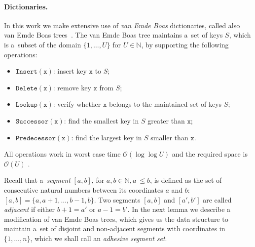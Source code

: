 \documentclass[runningheads]{llncs}
\newcommand{\Oh}{\mathcal{O}}
\renewcommand{\leq}{\leqslant}
\begin{document}
\paragraph*{Dictionaries.}
In this work we make extensive use of \emph{van Emde Boas} dictionaries,
called also {van Emde Boas trees}~\cite{VANEMDEBOAS197780}. The
van Emde Boas tree
maintains a~set of keys $S$, which is a~subset of the
domain $\{ 1, \ldots, U \}$ for $U\in \mathbb N$, by supporting the following
operations:
\begin{itemize}
 \item $\mathtt{Insert}(\mathtt{x})$:
    insert key $\mathtt{x}$ to $S$;
 \item $\mathtt{Delete}(\mathtt{x})$: remove key $\mathtt{x}$
 from $S$;
 \item $\mathtt{Lookup}(\mathtt{x})$: verify whether $\mathtt{x}$
 belongs to the maintained set of keys $S$;
 \item $\mathtt{Successor}(\mathtt{x})$: find the smallest key in
 $S$ greater than $\mathtt{x}$;
 \item $\mathtt{Predecessor}(\mathtt{x})$: find the largest key
 in $S$ smaller than $\mathtt{x}$.
\end{itemize}
All operations work in worst case time $\Oh(\log \log U)$ and
the
required space is $\Oh(U)$ \cite{VANEMDEBOAS197780}.

Recall that a~{\em{segment}} $[a,b]$, for $a,b \in \mathbb{N}, a~\leq b$, is defined as the
set of consecutive natural numbers between its coordinates $a$ and $b$:
$[a,b]= \{a, a+1, \ldots, b-1, b \}$. Two segments $[a,b]$ and
$[a',b']$ are called
{\em{adjacent}} if either $b+1=a'$ or $a-1=b'$.
In the next lemma we describe a modification of van Emde Boas trees, which gives
us the data structure to maintain a~set of
disjoint and non-adjacent segments with coordinates in $\{ 1, \ldots, n \}$, which we shall call an {\em{adhesive segment set}}.
\end{document}
